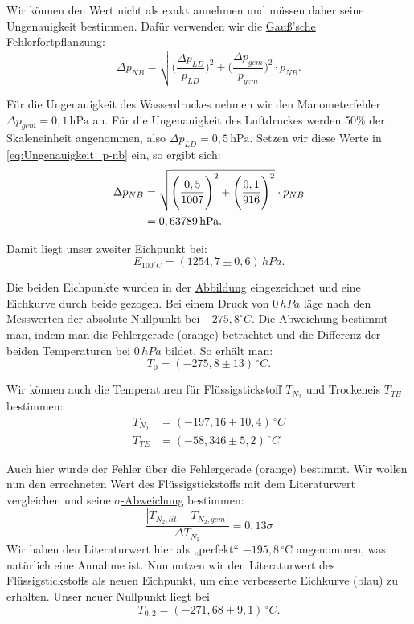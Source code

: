Wir können den Wert nicht als exakt annehmen und müssen daher seine Ungenauigkeit bestimmen. Dafür verwenden wir die \hyperref[eq:gauss_fehlfortpflanzung]{Gauß'sche Fehlerfortpflanzung}:
\begin{equation}
    \Delta p_{NB} = \sqrt{\Bigg(\frac{\Delta p_{LD}}{p_{LD}}\Bigg)^2 + \Bigg(\frac{\Delta p_{gem}}{p_{gem}}\Bigg)^2} \cdot p_{NB}.
    \label{eq:Ungenauigkeit_p-nb}
\end{equation}

Für die Ungenauigkeit des Wasserdruckes nehmen wir den Manometerfehler $\Delta p_{gem} = 0,1\,\text{hPa}$ an. Für die Ungenauigkeit des Luftdruckes werden 50\% der Skaleneinheit angenommen, also $\Delta p_{LD} = 0,5\,\text{hPa}$.
Setzen wir diese Werte in \autoref{eq:Ungenauigkeit_p-nb} ein, so ergibt sich:
\begin{align}
    \Delta p_{NB} &= \sqrt{\Bigg(\frac{0,5}{1007}\Bigg)^2 + \Bigg(\frac{0,1}{916}\Bigg)^2} \cdot p_{NB} \notag \\
     &= 0,63789 \, \text{hPa}.
\end{align}

Damit liegt unser zweiter Eichpunkt bei:
\begin{equation}
    \boxed{E_{100^\circ C} = (1254,7 \pm 0,6) \, hPa}.
    \label{e:1}
\end{equation}

Die beiden Eichpunkte wurden in der \hyperref[fig:graphisch_temp_druck]{Abbildung} eingezeichnet und eine Eichkurve durch beide gezogen. Bei einem Druck von $0 \, hPa$ läge nach den Messwerten der absolute Nullpunkt bei $-275,8^\circ C$.
Die Abweichung bestimmt man, indem man die Fehlergerade (orange) betrachtet und die Differenz der beiden Temperaturen bei $0 \, hPa$ bildet. So erhält man:
\begin{equation}
     \boxed{T_0 = (-275,8 \pm 13)  \, ^\circ C}.
     \label{e:2}
\end{equation}

Wir können auch die Temperaturen für Flüssigstickstoff $T_{N_2}$ und Trockeneis $T_{TE}$ bestimmen:
\begin{align}
   T_{N_2} &= \boxed{(-197,16 \pm 10,4)\, ^\circ C} \\
   T_{TE}  &= \boxed{(-58,346 \pm 5,2)\, ^\circ C}
\end{align}

Auch hier wurde der Fehler über die Fehlergerade (orange) bestimmt. 
Wir wollen nun den errechneten Wert des Flüssigstickstoffs mit dem Literaturwert vergleichen und seine \hyperref[eq:signifikante_abweichung]{$\sigma$-Abweichung} bestimmen:
\begin{equation}
    \frac{\left| T_{N_2,lit} - T_{N_2,gem} \right|}{\Delta T_{N_2}} = 0,13\sigma
\end{equation}
Wir haben den Literaturwert hier als „perfekt“ $-195,8 \, ^\circ\text{C}$ angenommen, was natürlich eine Annahme ist. 
Nun nutzen wir den Literaturwert des Flüssigstickstoffs als neuen Eichpunkt, um eine verbesserte Eichkurve (blau) zu erhalten.
Unser neuer Nullpunkt liegt bei
\begin{equation}
    T_{0,2} = (-271,68 \pm 9,1) \, ^\circ C.
\end{equation}

